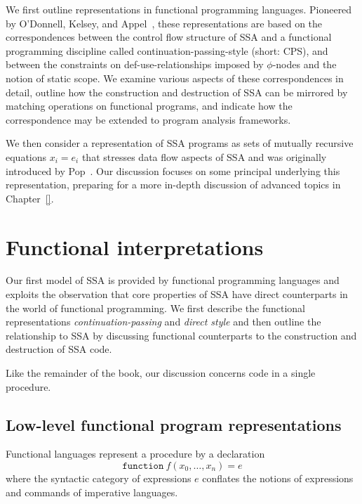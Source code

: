 We first outline representations in functional programming languages.
Pioneered by O'Donnell, Kelsey, and
Appel~\cite{ODonnellPhD,Kelsey95,Appel98:SSA}, these representations
are based on the correspondences between the control flow structure of
SSA and a functional programming discipline called
continuation-passing-style (short: CPS), and between the constraints
on def-use-relationships imposed by $\phi$-nodes and the notion of
static scope. We examine various aspects of these correspondences in
detail, outline how the construction and destruction of SSA can be
mirrored by matching operations on functional programs, and indicate
how the correspondence may be extended to program analysis frameworks.

We then consider a representation of SSA programs as sets of mutually
recursive equations $x_i = e_i$ that stresses data flow aspects of SSA
and was originally introduced by Pop~\cite{PopJS2007}.  Our discussion
focuses on some principal underlying this representation, preparing
for a more in-depth discussion of advanced topics in Chapter~\ref{}.


\section{Functional interpretations}
\label{section:Part1:Semantics:FunctionalLanguages}

Our first model of SSA is provided by functional programming languages
and exploits the observation that core properties of SSA have direct
counterparts in the world of functional programming.  We first
describe  the functional representations
\emph{continuation-passing} and \emph{direct style} and then outline
the relationship to SSA by discussing functional counterparts to the
construction and destruction of SSA code.

Like the remainder of the book, our discussion concerns code in a
single procedure.

\subsection{Low-level functional program representations}
\label{section:Part1:Semantics:LowLevelReps}

Functional languages represent a procedure by a declaration
$$\mathtt{function}\ f(x_0, \ldots, x_n) = e$$ where the syntactic
category of expressions $e$ conflates the notions of expressions and
commands of imperative languages.

